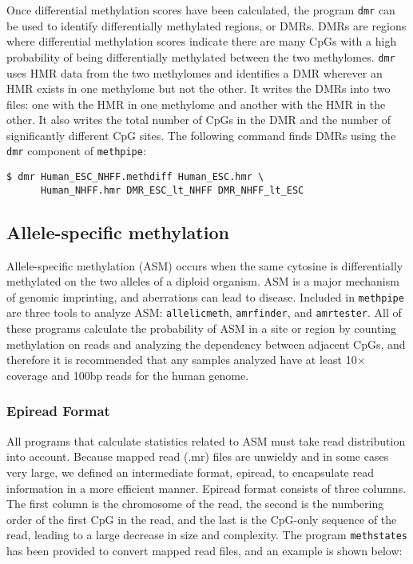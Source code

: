 \documentclass[10pt]{article}
\newcommand{\meth}{\texttt{methpipe}}
\newcommand{\prog}[1]{\texttt{#1}}
\begin{document}
Once differential methylation scores have been calculated, the program
\prog{dmr} can be used to identify differentially methylated regions,
or DMRs. DMRs are regions where differential methylation scores
indicate there are many CpGs with a high probability of being
differentially methylated between the two methylomes.
\prog{dmr} uses HMR data from the two methylomes and identifies
a DMR wherever an HMR exists in one methylome but not the other.
It writes the DMRs into two files: one with the HMR in one methylome
and another with the HMR in the other.  It also writes the total number
of CpGs in the DMR and the number of significantly different CpG sites.
The following command finds DMRs using the \prog{dmr} component
of \meth{}:
\begin{verbatim}
$ dmr Human_ESC_NHFF.methdiff Human_ESC.hmr \
      Human_NHFF.hmr DMR_ESC_lt_NHFF DMR_NHFF_lt_ESC
\end{verbatim}

\subsection{Allele-specific methylation}

Allele-specific methylation (ASM) occurs when the same cytosine is
differentially methylated on the two alleles of a diploid organism.
ASM is a major mechanism of genomic imprinting, and aberrations can
lead to disease. Included in \prog{methpipe} are three tools to
analyze ASM: \prog{allelicmeth}, \prog{amrfinder}, and \prog{amrtester}.
All of these programs calculate the probability of ASM in a site or
region by counting methylation on reads and analyzing the dependency
between adjacent CpGs, and therefore it is recommended that any samples
analyzed have at least 10$\times$ coverage and 100bp reads for the human
genome.

\subsubsection{Epiread Format}

All programs that calculate statistics related to ASM must take read
distribution into account. Because mapped read (.mr) files are unwieldy
and in some cases very large, we defined an intermediate format, epiread,
to encapsulate read information in a more efficient manner. Epiread format
consists of three columns. The first column is the chromosome of the read,
the second is the numbering order of the first CpG in the read, and the
last is the CpG-only sequence of the read, leading to a large decrease in
size and complexity. The program \prog{methstates} has been provided to
convert mapped read files, and an example is shown below:
\end{document}
